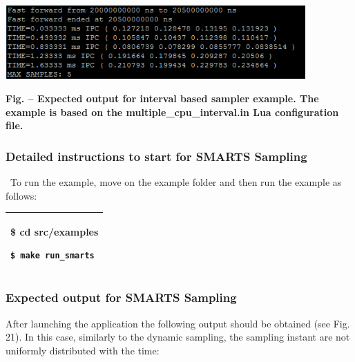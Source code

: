 \documentclass[a4paper]{article}
\newcounter{Figure}
\renewcommand\theFigure{\arabic{Figure}}
\begin{document}
{\centering 
\includegraphics[width=4.5346in,height=1.1075in]{img37.png}
\par}

{\centering{}\sffamily\bfseries
\label{bkm:Ref388204406}Fig.
\stepcounter{Figure}{\theFigure} -- Expected output for interval based
sampler example. The example is based on the multiple\_cpu\_interval.in
Lua configuration file.
\par}

\subsubsection[Detailed instructions to start for SMARTS
Sampling]{\textrm{Detailed instructions to
start}\foreignlanguage{english}{\textrm{ for SMARTS Sampling}}}
{
\ To run the example, move on the example folder and then run the
example as follows:}

\begin{flushleft}
\tablehead{}
\begin{supertabular}{|m{6.21846in}|}
\hline
{\ttfamily \$ cd src/examples}

 \texttt{\$ make run\_smarts}\\\hline
\end{supertabular}
\end{flushleft}
\subsubsection[Expected output for SMARTS Sampling]{\textrm{Expected
output}\foreignlanguage{english}{\textrm{ for SMARTS Sampling}}}
{
After launching the application the following output should be obtained
(see Fig. 21). In this case, similarly to the dynamic sampling, the
sampling instant are not uniformly distributed with the time:}
\end{document}

